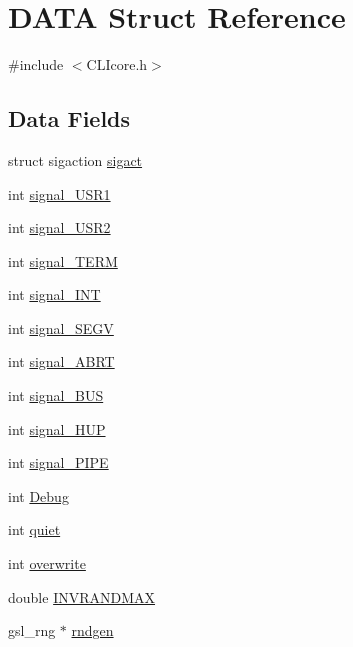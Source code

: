\hypertarget{structDATA}{}\section{D\+A\+T\+A Struct Reference}
\label{structDATA}


{\ttfamily \#include $<$C\+L\+Icore.\+h$>$}

\subsection*{Data Fields}
\begin{DoxyCompactItemize}
\item 
struct sigaction \hyperlink{structDATA_a24a327ad06e9f5c593d4dbd4665afab8}{sigact}
\item 
int \hyperlink{structDATA_a64bae9d671e98229a54fea43d5d4f9b5}{signal\+\_\+\+U\+S\+R1}
\item 
int \hyperlink{structDATA_a2be71623c71eb07003ff60f14240b31a}{signal\+\_\+\+U\+S\+R2}
\item 
int \hyperlink{structDATA_a700e0a489eabf7785da7361c2135f159}{signal\+\_\+\+T\+E\+R\+M}
\item 
int \hyperlink{structDATA_a2115f511041aeeab82362a9df65a0559}{signal\+\_\+\+I\+N\+T}
\item 
int \hyperlink{structDATA_aacd64e13fa75fd7ef3eec511d8e450fb}{signal\+\_\+\+S\+E\+G\+V}
\item 
int \hyperlink{structDATA_a9b81633fc9e733802e8728fb576d0dad}{signal\+\_\+\+A\+B\+R\+T}
\item 
int \hyperlink{structDATA_acf9d0a530498a0b4686669a8804ace39}{signal\+\_\+\+B\+U\+S}
\item 
int \hyperlink{structDATA_af93e1812297d27834fc3ef540bdc3c20}{signal\+\_\+\+H\+U\+P}
\item 
int \hyperlink{structDATA_a344a1577d41f11ddafcd06d1c892fc75}{signal\+\_\+\+P\+I\+P\+E}
\item 
int \hyperlink{structDATA_a8148a9459923d124f03989f0c796e137}{Debug}
\item 
int \hyperlink{structDATA_a3f7eda27560572dd2510250a1935deb5}{quiet}
\item 
int \hyperlink{structDATA_a600cb8c85d463a76ca1dfe9d0097c8f3}{overwrite}
\item 
double \hyperlink{structDATA_aa17d253cb7412ac4cbc8f034dfe78308}{I\+N\+V\+R\+A\+N\+D\+M\+A\+X}
\item 
gsl\+\_\+rng $\ast$ \hyperlink{structDATA_a819c0e911d771dbb7da0dbf26e993fc2}{rndgen}
\item 

\end{DoxyCompactItemize}
